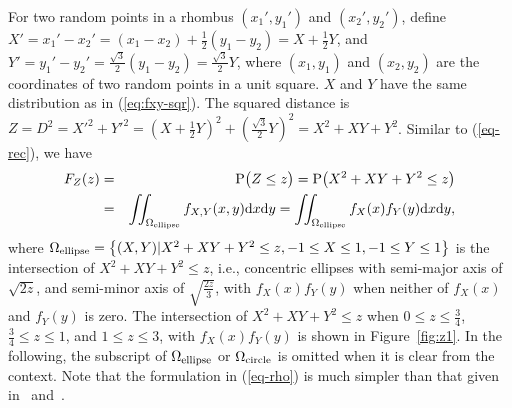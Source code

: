 \documentclass[12pt,draftclsnofoot,onecolumn]{IEEEtran}
\begin{document}
For two random points in a rhombus $(x_1',y_1')$ and $(x_2',y_2')$, define
$X'=x_1'-x_2'=\left(x_1-x_2\right)+\frac{1}{2}\left(y_1-y_2\right)=X+\frac{1}{2}
Y$, and
$Y'=y_1'-y_2'=\frac{\sqrt{3}}{2}\left(y_1-y_2\right)=\frac{\sqrt{3}}{2}Y$, where
$(x_1, y_1)$ and $(x_2, y_2)$ are the coordinates of two random points in a
unit square. $X$ and $Y$ have the same distribution as in
(\ref{eq:fxy-sqr}). The squared distance is $Z=D^2=X'^2+Y'^2=\left(X+\frac{1}{2}
Y\right)^2+\left(\frac{\sqrt{3}}{2}Y\right)^2=X^2+XY+Y^2$. Similar to
(\ref{eq-rec}), we have
\begin{eqnarray}\label{eq-rho}
F_Z(z)&=&{\rm P}\big(Z \leq z \big) = {\rm P}\big(X^2+XY+Y^2 \leq z \big)\nonumber\\
&=&\iint_{\Omega_{\rm ellipse}}f_{X,Y}(x,y){\rm d}x{\rm d}y=
\iint_{\Omega_{\rm ellipse}}f_X(x)f_Y(y){\rm d}x{\rm d}y,
\end{eqnarray}
where $\Omega_{\rm ellipse}=\left\{(X,Y)|X^2+XY+Y^2\leq z, -1 \leq X \leq 1, -1 
\leq Y \leq 1\right\}$ is the intersection of $X^2+XY+Y^2\leq z$, i.e., concentric 
ellipses with semi-major axis of $\sqrt{2z}$, and semi-minor axis of $\sqrt{\frac{2z}{3}}$, 
with $f_X(x)f_Y(y)$ when neither of $f_X(x)$ and $f_Y(y)$ is zero.
The intersection of  $X^2+XY+Y^2\leq z$ when $0\leq z \leq \frac{3}{4}$, $\frac{3}{4}\leq z \leq 1$, 
and $1\leq z \leq 3$, with $f_X(x)f_Y(y)$ is shown in Figure~\ref{fig:z1}.
In the following, the subscript of $\Omega_{\rm ellipse}$ or $\Omega_{\rm circle}$ is
omitted when it is clear from the context.
Note that the formulation in (\ref{eq-rho}) is much simpler than that given in~\cite{zhuang2011random}
and~\cite{zhuang2012geometrical}.
\end{document}
